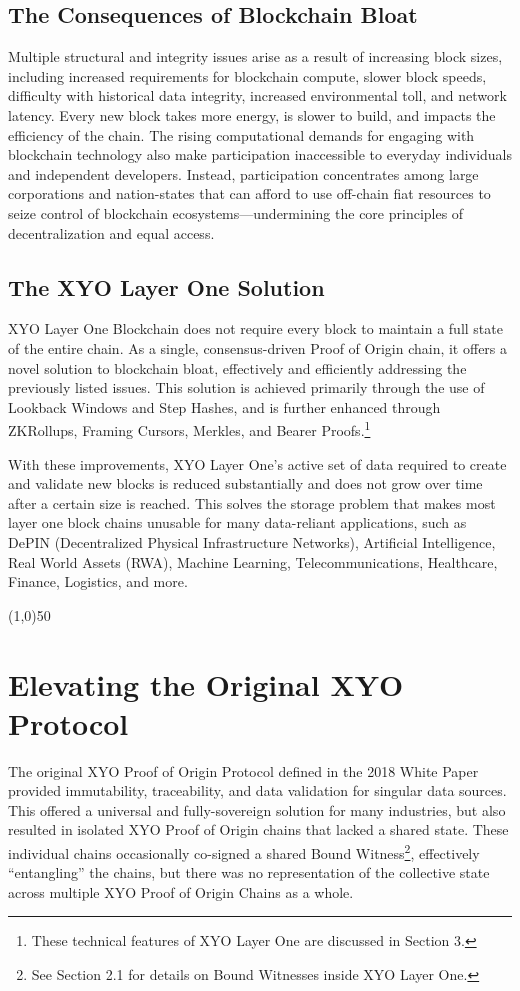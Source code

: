 \documentclass{article}
\begin{document}
\subsection{The Consequences of Blockchain Bloat}
Multiple structural and integrity issues arise as a result of increasing block sizes, including increased requirements for blockchain compute, slower block speeds, difficulty with historical data integrity, increased environmental toll, and network latency. Every new block takes more energy, is slower to build, and impacts the efficiency of the chain. The rising computational demands for engaging with blockchain technology also make participation inaccessible to everyday individuals and independent developers. Instead, participation concentrates among large corporations and nation-states that can afford to use off-chain fiat resources to seize control of blockchain ecosystems—undermining the core principles of decentralization and equal access. 

\subsection{The XYO Layer One Solution}
XYO Layer One Blockchain does not require every block to maintain a full state of the entire chain. As a single, consensus-driven Proof of Origin chain, it offers a novel solution to blockchain bloat, effectively and efficiently addressing the previously listed issues. This solution is achieved primarily through the use of Lookback Windows and Step Hashes, and is further enhanced through ZKRollups, Framing Cursors, Merkles, and Bearer Proofs.\footnote{These technical features of XYO Layer One are discussed in Section 3.}

With these improvements, XYO Layer One's active set of data required to create and validate new blocks is reduced substantially and does not grow over time after a certain size is reached. This solves the storage problem that makes most layer one block chains unusable for many data-reliant applications, such as DePIN (Decentralized Physical Infrastructure Networks), Artificial Intelligence, Real World Assets (RWA), Machine Learning, Telecommunications, Healthcare, Finance, Logistics, and more. 

\begin{center}
    \line(1,0){50}
\end{center}

\section{Elevating the Original XYO Protocol}
The original XYO Proof of Origin Protocol defined in the 2018 White Paper provided immutability, traceability, and data validation for singular data sources. This offered a universal and fully-sovereign solution for many industries, but also resulted in isolated XYO Proof of Origin chains that lacked a shared state. These individual chains occasionally co-signed a shared Bound Witness\footnote{See Section 2.1 for details on Bound Witnesses inside XYO Layer One.}, effectively “entangling” the chains, but there was no representation of the collective state across multiple XYO Proof of Origin Chains as a whole. 
\end{document}
